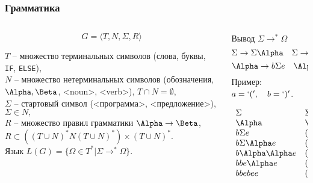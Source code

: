 \documentclass[10pt]{beamer}
\begin{document}
\begin{frame}
  \frametitle{Грамматика}
   \begin{columns}
     \begin{column}{0.6\textwidth}
       \begin{block}{}
       \[
         G=\langle T,N,\Sigma,R\rangle
       \]
     \end{block}
       $T$ -- множество терминальных символов (слова, буквы, \texttt{IF}, \texttt{ELSE}),\\
       $N$ -- множество нетерминальных символов (обозначения, $\Alpha, \Beta$, <noun>, <verb>), $T\cap N=\emptyset,$\\
       $\Sigma$ -- стартовый символ (<программа>, <предложение>), $\Sigma\in N,$\\
       $R$ -- множество правил грамматики $\Alpha\to\Beta$, \\$R\subset((T\cup N)^* N(T \cup N)^*)\times(T\cup N)^*$.\\[0.5em]
       Язык $L(G)=\{\Omega\in T^* | \Sigma\to^*\Omega\}$.
     \end{column}
     \begin{column}{0.4\textwidth}
       \begin{block}{Вывод $\Sigma\to^*\Omega$}
         \[\Sigma\to\Sigma\Alpha\quad \Sigma\to\Alpha\]
         \[\Alpha\to b\Sigma e\quad \Alpha\to be \]
         Пример: \(a=`(',\quad b=`)'\).
         \begin{raggedleft}
           \[
             \begin{array}{ll}
               \Sigma & \Sigma\\
               \Alpha & \Alpha\\
               b\Sigma e & ( \Sigma )\\
               b\Sigma\Alpha e & ( \Sigma\Alpha )\\
               b\Alpha\Alpha e & ( \Alpha\Alpha )\\
               bbe\Alpha e & (() \Alpha )\\
               bbebee & (()())
             \end{array} \]
         \end{raggedleft}
     \end{block}
     \end{column}
   \end{columns}
  \begin{center}
  \end{center}
\end{frame}
\end{document}
